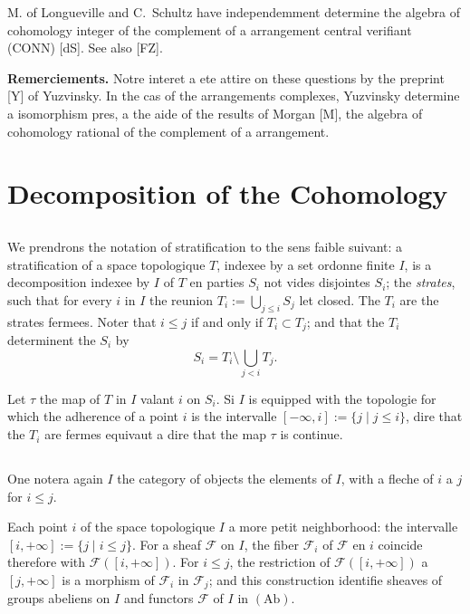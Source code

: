 \documentclass[11pt,a4paper]{article}
\theoremstyle{plain}
\theoremstyle{definition}
\begin{document}
M. of Longueville and C.~Schultz have independemment determine the algebra of cohomology integer of the complement of a arrangement central verifiant (CONN) [dS]. See also [FZ].

\textbf{Remerciements.} Notre interet a ete attire on these questions by the preprint [Y] of Yuzvinsky. In the cas of the arrangements complexes, Yuzvinsky determine a isomorphism pres, a the aide of the results of Morgan [M], the algebra of cohomology rational of the complement of a arrangement.

\section{Decomposition of the Cohomology}

\subsection{}

We prendrons the notation of stratification to the sens faible suivant: a stratification of a space topologique $T$, indexee by a set ordonne finite $I$, is a decomposition indexee by $I$ of $T$ en parties $S_i$ not vides disjointes $S_i$; the \emph{strates}, such that for every $i$ in $I$ the reunion $T_i := \bigcup_{j \leq i} S_j$ let closed. The $T_i$ are the strates fermees. Noter that $i \leq j$ if and only if $T_i \subset T_j$; and that the $T_i$ determinent the $S_i$ by
\begin{equation}\label{eq:1.1.1}
S_i = T_i \setminus \bigcup_{j<i} T_j.
\tag{1.1.1}
\end{equation}

Let $\tau$ the map of $T$ in $I$ valant $i$ on $S_i$. Si $I$ is equipped with the topologie for which the adherence of a point $i$ is the intervalle $[-\infty,i] := \{j \mid j \leq i\}$, dire that the $T_i$ are fermes equivaut a dire that the map $\tau$ is continue.

\subsection{}

One notera again $I$ the category of objects the elements of $I$, with a fleche of $i$ a $j$ for $i \leq j$.

Each point $i$ of the space topologique $I$ a more petit neighborhood: the intervalle $[i,+\infty] := \{j \mid i \leq j\}$. For a sheaf $\mathcal{F}$ on $I$, the fiber $\mathcal{F}_i$ of $\mathcal{F}$ en $i$ coincide therefore with $\mathcal{F}([i,+\infty])$. For $i \leq j$, the restriction of $\mathcal{F}([i,+\infty])$ a $[j,+\infty]$ is a morphism of $\mathcal{F}_i$ in $\mathcal{F}_j$; and this construction identifie sheaves of groups abeliens on $I$ and functors $\mathcal{F}$ of $I$ in $(\mathrm{Ab})$.
\end{document}
